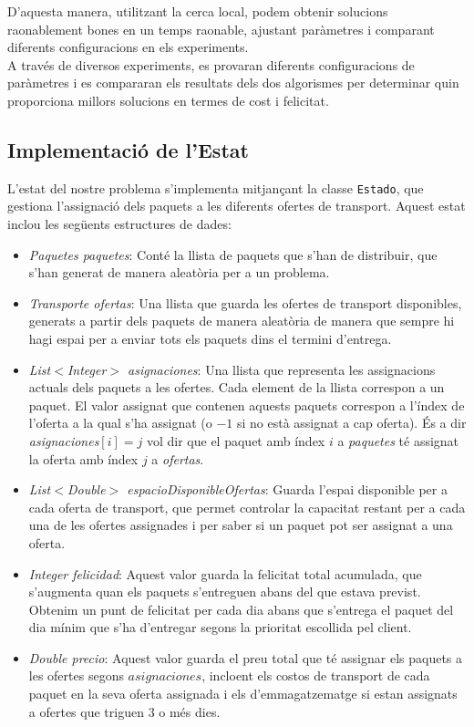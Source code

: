 \documentclass[a4paper]{article}
\begin{document}
	D'aquesta manera, utilitzant la cerca local, podem obtenir solucions raonablement bones en un temps raonable, ajustant paràmetres i comparant diferents configuracions en els experiments. \\
	
	A través de diversos experiments, es provaran diferents configuracions de paràmetres i es compararan els resultats dels dos algorismes per determinar quin proporciona millors solucions en termes de cost i felicitat.
	
	\subsection{Implementació de l'Estat}
	
	L'estat del nostre problema s'implementa mitjançant la classe \texttt{Estado}, que gestiona l'assignació dels paquets a les diferents ofertes de transport. Aquest estat inclou les següents estructures de dades:
	
	\begin{itemize}
		\item \emph{Paquetes paquetes}: Conté la llista de paquets que s'han de distribuir, que s'han generat de manera aleatòria per a un problema.
		\item \emph{Transporte ofertas}: Una llista que guarda les ofertes de transport disponibles, generats a partir dels paquets de manera aleatòria de manera que sempre hi hagi espai per a enviar tots els paquets dins el termini d'entrega.
		\item \emph{List$<$Integer$>$ asignaciones}: Una llista que representa les assignacions actuals dels paquets a les ofertes. Cada element de la llista correspon a un paquet. El valor assignat que contenen aquests paquets correspon a l'índex de l'oferta a la qual s'ha assignat (o $-1$ si no està assignat a cap oferta). És a dir \emph{asignaciones$[i] = j$} vol dir que el paquet amb índex $i$ a \textit{paquetes} té assignat la oferta amb índex $j$ a \textit{ofertas}.
		\item \emph{List$<$Double$>$ espacioDisponibleOfertas}: Guarda l'espai disponible per a cada oferta de transport, que permet controlar la capacitat restant per a cada una de les ofertes assignades i per saber si un paquet pot ser assignat a una oferta.
		\item \emph{Integer felicidad}: Aquest valor guarda la felicitat total acumulada, que s'augmenta quan els paquets s'entreguen abans del que estava previst. Obtenim un punt de felicitat per cada dia abans que s'entrega el paquet del dia mínim que s'ha d'entregar segons la prioritat escollida pel client.
		\item \emph{Double precio}: Aquest valor guarda el preu total que té assignar els paquets a les ofertes segons $asignaciones$, incloent els costos de transport de cada paquet en la seva oferta assignada i els d'emmagatzematge si estan assignats a ofertes que triguen $3$ o més dies.
	\end{itemize}
		
\end{document}
